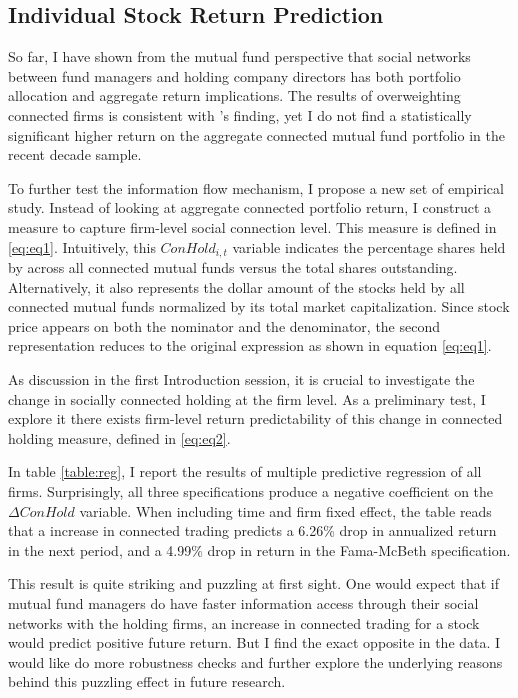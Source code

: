 \documentclass[11pt]{article}
\begin{document}
\begin{doublespace}
\subsection{Individual Stock Return Prediction}
So far, I have shown from the mutual fund perspective that social networks between fund managers and holding company directors has both portfolio allocation and aggregate return implications. The results of overweighting connected firms is consistent with 
\cite{cohen2008small} 's finding, yet I do not find a statistically significant higher return on the aggregate connected mutual fund portfolio in the recent decade sample. 

To further test the information flow mechanism, I propose a new set of empirical study. Instead of looking at aggregate connected portfolio return, I construct a measure to capture firm-level social connection level. This measure is defined in \ref{eq:eq1}. Intuitively, this $ConHold_{i,t}$ variable indicates the percentage shares held by across all connected mutual funds versus the total shares outstanding. Alternatively, it also represents the dollar amount of the stocks held by all connected mutual funds normalized by its total market capitalization. Since stock price appears on both the nominator and the denominator, the second representation reduces to the original expression as shown in equation \ref{eq:eq1}.

As discussion in the first Introduction session, it is crucial to investigate the change in socially connected holding at the firm level. As a preliminary test, I explore it there exists firm-level return predictability of this change in connected holding measure, defined in \ref{eq:eq2}. 

In table \ref{table:reg}, I report the results of multiple predictive regression of all firms. Surprisingly, all three specifications produce a negative coefficient on the $\Delta ConHold$ variable. When including time and firm fixed effect, the table reads that a increase in connected trading predicts a 6.26\% drop in annualized return in the next period, and a 4.99\% drop in return in the Fama-McBeth specification. 

This result is quite striking and puzzling at first sight. One would expect that if mutual fund managers do have faster information access through their social networks with the holding firms, an increase in connected trading for a stock would predict positive future return. But I find the exact opposite in the data. I would like do more robustness checks and further explore the underlying reasons behind this puzzling effect in future research. 



\end{doublespace}
\end{document}

